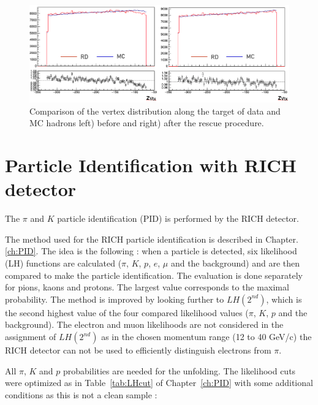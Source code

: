 \begin{figure}[!h]
	\includegraphics[scale=0.45]{./gfx/VertexDrop.png}
	\caption{Comparison of the vertex distribution along the target of data and MC hadrons left) before and right) after the rescue procedure.}
	\label{VertexDrop}
\end{figure}


\section{Particle Identification with RICH detector}

The $\pi$ and $K$ particle identification (PID) is performed by the RICH detector.

The method used for the RICH particle identification is described in Chapter. \ref{ch:PID}. The idea is the following : when a particle is detected, six likelihood (LH) functions are calculated ($\pi$, $K$, $p$, $e$, $\mu$ and the background) and are then compared to make the particle identification. The evaluation is done separately for pions, kaons and protons. The largest value corresponds to the maximal probability. The method is improved by looking further to $LH(2^{nd})$, which is the second highest value of the four compared likelihood values ($\pi$, $K$, $p$ and the background). The electron and muon likelihoods are not considered in the assignment of $LH(2^{nd})$ as in the chosen momentum range (12 to 40 GeV/c) the RICH detector can not be used to efficiently distinguish electrons from $\pi$.

All $\pi$, $K$ and $p$ probabilities are needed for the unfolding. The likelihood cuts were optimized as in Table~\ref{tab:LHcut} of Chapter~\ref{ch:PID} with some additional conditions as this is not a clean sample :

